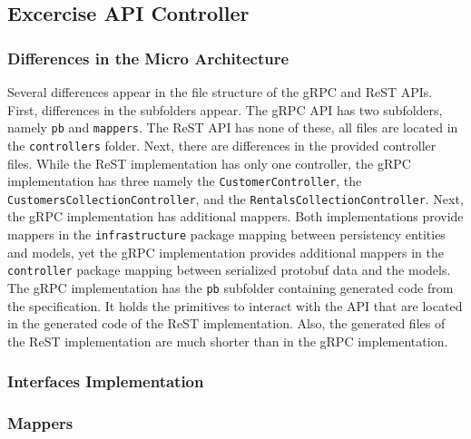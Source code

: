 \subsection{Excercise API Controller}
\subsubsection*{Differences in the Micro Architecture}
Several differences appear in the file structure of the gRPC and ReST APIs.
First, differences in the subfolders appear.
The gRPC API has two subfolders, namely \texttt{pb} and \texttt{mappers}.
The ReST API has none of these, all files are located in the \texttt{controllers} folder.
Next, there are differences in the provided controller files.
While the ReST implementation has only one controller, the gRPC implementation has three namely the \texttt{CustomerController}, the \texttt{CustomersCollectionController}, and the \texttt{RentalsCollectionController}.
Next, the gRPC implementation has additional mappers.
Both implementations provide mappers in the \texttt{infrastructure} package mapping between persistency entities and models, yet the gRPC implementation provides additional mappers in the \texttt{controller} package mapping between serialized protobuf data and the models.
The gRPC implementation has the \texttt{pb} subfolder containing generated code from the specification.
It holds the primitives to interact with the API that are located in the generated code of the ReST implementation.
Also, the generated files of the ReST implementation are much shorter than in the gRPC implementation.

\subsubsection*{Interfaces Implementation}



\subsubsection*{Mappers}

